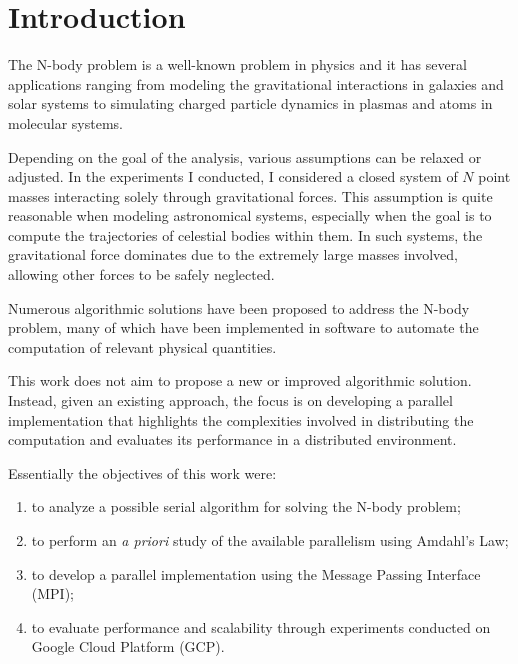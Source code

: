 \documentclass{article}
\begin{document}
\tableofcontents

\clearpage
\thispagestyle{plain}

\twocolumn

\section{Introduction}
\label{sec:intro}
The N-body problem is a well-known problem in physics and it has several applications ranging from modeling the gravitational interactions in galaxies and solar systems to simulating charged particle dynamics in plasmas and atoms in molecular systems.

Depending on the goal of the analysis, various assumptions can be relaxed or adjusted. In the experiments I conducted, I considered a closed system of $N$ point masses interacting solely through gravitational forces. This assumption is quite reasonable when modeling astronomical systems, especially when the goal is to compute the trajectories of celestial bodies within them. In such systems, the gravitational force dominates due to the extremely large masses involved, allowing other forces to be safely neglected.

Numerous algorithmic solutions have been proposed to address the N-body problem, many of which have been implemented in software to automate the computation of relevant physical quantities.

This work does not aim to propose a new or improved algorithmic solution. Instead, given an existing approach, the focus is on developing a parallel implementation that highlights the complexities involved in distributing the computation and evaluates its performance in a distributed environment.

Essentially the objectives of this work were:
\begin{enumerate}
\item to analyze a possible serial algorithm for solving the N-body problem;
\item to perform an \emph{a priori} study of the available parallelism using Amdahl's Law;
\item to develop a parallel implementation using the Message Passing Interface (MPI);
\item to evaluate performance and scalability through experiments conducted on Google Cloud Platform (GCP).
\end{enumerate}
\end{document}
